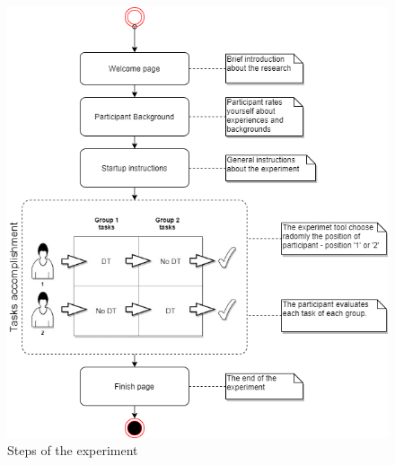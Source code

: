 \begin{figure}[ht]
\centering
\includegraphics[width=13cm]{figures/experiment_flow.png}
\caption{Steps of the experiment}
\label{fig:experimentSteps}
\end{figure}

